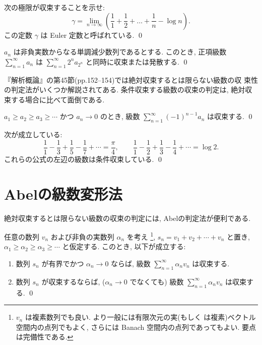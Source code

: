 \documentclass[12pt,twoside]{jarticle}
\begin{document}
\begin{question}[Eulerの定数]
  次の極限が収束することを示せ:
  \[
    \gamma 
    = \lim_{n\to\infty} 
      \left( \frac{1}{1} + \frac{1}{2} + \dots +\frac{1}{n} - \log n \right).
  \]
  この定数 $\gamma$ は Euler 定数と呼ばれている. \qed
\end{question}

\begin{question}[Cauchyの凝集判定法]
  $a_n$ は非負実数からなる単調減少数列であるとする. %
  このとき, 正項級数 $\sum\limits_{n=1}^\infty a_n$ は %
  $\sum\limits_{n=1}^\infty 2^n a_{2^n}$ と同時に収束または発散する. 
  \qed
\end{question}

『解析概論』の第45節(pp.152--154)では絶対収束するとは限らない級数の収
束性の判定法がいくつか解説されてある. 条件収束する級数の収束の判定は, 
絶対収束する場合に比べて面倒である.

\begin{question}[交代級数]
  $a_1 \ge a_2 \ge a_3 \ge \cdots$ かつ %
  $a_n \to 0$ のとき, %
  級数 $\displaystyle\sum_{n=1}^\infty (-1)^{n-1} a_n$ は収束する. \qed
\end{question}

\begin{question}
  次が成立している:
  \[
    \frac{1}{1} - \frac{1}{3} + \frac{1}{5} - \frac{1}{7} + \cdots
    =
    \frac{\pi}{4},
    \qquad
    \frac{1}{1} - \frac{1}{2} + \frac{1}{3} - \frac{1}{4} + \cdots
    =
    \log 2.
  \] %
  これらの公式の左辺の級数は条件収束している. \qed
\end{question}


\section{Abelの級数変形法}\label{sec:Abel-partial-sum}

絶対収束するとは限らない級数の収束の判定には, Abelの判定法が便利である.

\begin{question}[Abelの判定法]\qstar{*}
  任意の数列 $v_n$ および非負の実数列 $\alpha_n$ を考え%
  \footnote{$v_n$ は複素数列でも良い. より一般には有限次元の実(もしく
    は複素)ベクトル空間内の点列でもよく, さらには 
    Banach 空間内の点列であってもよい. 要点は完備性である.}, %
  $s_n = v_1 + v_2 + \cdots + v_n$ と置き, %
  $\alpha_1 \ge \alpha_2 \ge \alpha_3 \ge \cdots$ と仮定する. このとき,
  以下が成立する:
  \begin{enumerate}
  \item 数列 $s_n$ が有界でかつ $\alpha_n \to 0$ ならば, %
    級数 $\sum\limits_{n=1}^\infty \alpha_n v_n$ は収束する.
  \item 数列 $s_n$ が収束するならば, ($\alpha_n \to 0$ でなくても) %
    級数 $\sum\limits_{n=1}^\infty \alpha_n v_n$ は収束する.
  \qed
  \end{enumerate}
\end{question}
\end{document}
